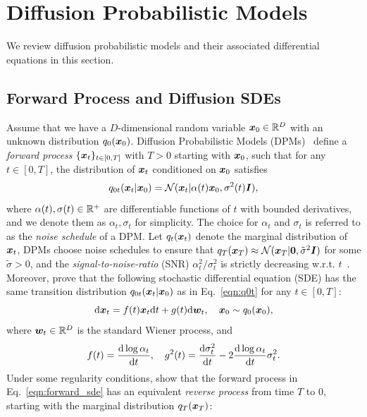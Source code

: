 \section{Diffusion Probabilistic Models}
\label{sec:bg}
We review diffusion probabilistic models and  their associated differential equations in this section.
\subsection{Forward Process and Diffusion SDEs}\label{sec:diffusion-sde}
Assume that we have a $D$-dimensional random variable $\bm{x}_0\in\mathbb{R}^{D}$ with an unknown distribution $q_0(\bm{x}_0)$. Diffusion Probabilistic Models (DPMs)~\citep{sohl2015deep,ho2020denoising,song2020score,kingma2021variational} define  a \textit{forward process} $\{\bm{x}_t\}_{t\in[0,T]}$ with $T>0$ starting with $\bm{x}_0$, such that for any $t\in [0,T]$, the distribution of $\bm{x}_t$ conditioned on $\bm{x}_0$ satisfies
\begin{equation}
\label{eqn:q0t}
    q_{0t}(\bm{x}_t|\bm{x}_0)=\mathcal{N}(\bm{x}_t | \alpha(t)\bm{x}_0, \sigma^2(t)\bm{I}),
\end{equation}
where $\alpha(t),\sigma(t) \in \mathbb{R}^{+}$ are differentiable functions of $t$ with bounded derivatives, and we denote them as $\alpha_t,\sigma_t$ for simplicity. The choice for $\alpha_t$ and $\sigma_t$ is referred to as the \textit{noise schedule} of a DPM.
Let $q_t(\bm{x}_t)$ denote the marginal distribution of $\bm{x}_t$, DPMs choose noise schedules to ensure that $q_T(\bm{x}_T)\approx \mathcal{N}(\bm{x}_T|\bm{0},\tilde\sigma^2\bm{I})$ for some $\tilde\sigma>0$, and the \textit{signal-to-noise-ratio} (SNR) $\alpha_t^2 / \sigma_t^2$ is strictly decreasing w.r.t. $t$~\citep{kingma2021variational}.  Moreover, \citet{kingma2021variational} prove that the following stochastic differential equation (SDE) has the same transition distribution $q_{0t}(\bm{x}_t|\bm{x}_0)$ as in Eq.~\eqref{eqn:q0t} for any $t\in[0,T]$:
\begin{equation}
\label{eqn:forward_sde}
    \mathrm{d}\bm{x}_t = f(t)\bm{x}_t \mathrm{d}t + g(t) \mathrm{d}\bm{w}_t, \quad \bm{x}_0\sim q_0(\bm{x}_0),
\end{equation}
where $\bm{w}_t\in\mathbb{R}^D$ is the standard Wiener process, and
\begin{equation}
\label{eqn:ft_gt}
    f(t)= \frac{\dd \log \alpha_t}{\mathrm{d}t}, \quad g^2(t)=\frac{\dd\sigma_t^2}{\mathrm{d}t} - 2\frac{\dd\log\alpha_t}{\mathrm{d}t}\sigma_t^2.
\end{equation}
Under some regularity conditions, \citet{song2020score} show that the forward process in Eq.~\eqref{eqn:forward_sde} has an equivalent \textit{reverse process} from time $T$ to $0$, starting with the marginal distribution $q_T(\bm{x}_T)$:
